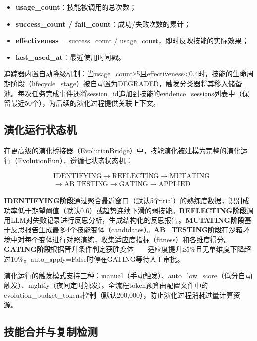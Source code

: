 \documentclass[conference]{IEEEtran}
\begin{document}
\begin{itemize}[nosep]
\item \textbf{usage\_count}：技能被调用的总次数；
\item \textbf{success\_count / fail\_count}：成功/失败次数的累计；
\item \textbf{effectiveness} = success\_count / usage\_count，即时反映技能的实际效果；
\item \textbf{last\_used\_at}：最近使用时间戳。
\end{itemize}

追踪器内置自动降级机制：当usage\_count≥5且effectiveness<0.4时，技能的生命周期阶段（lifecycle\_stage）被自动置为DEGRADED，触发分类器将其移入储备池。每次任务完成事件还将session\_id追加到技能的evidence\_sessions列表中（保留最近50个），为后续的演化过程提供关联上下文。

\subsection{演化运行状态机}

在更高级的演化桥接器（EvolutionBridge）中，技能演化被建模为完整的演化运行（EvolutionRun），遵循七状态状态机：

\begin{equation}
\begin{aligned}
&\mathrm{IDENTIFYING} \rightarrow \mathrm{REFLECTING} \rightarrow \mathrm{MUTATING} \\
&\rightarrow \mathrm{AB\_TESTING} \rightarrow \mathrm{GATING} \rightarrow \mathrm{APPLIED}
\end{aligned}
\label{eq:evo_state}
\end{equation}

\textbf{IDENTIFYING阶段}通过聚合最近窗口（默认5个trial）的熟练度数据，识别成功率低于期望阈值（默认0.6）或趋势连续下滑的弱技能。\textbf{REFLECTING阶段}调用LLM对失败记录进行反思分析，生成结构化的反思报告。\textbf{MUTATING阶段}基于反思报告生成最多4个技能变体（candidates）。\textbf{AB\_TESTING阶段}在沙箱环境中对每个变体进行对照演练，收集适应度指标（fitness）和各维度得分。\textbf{GATING阶段}根据晋升条件判定获胜变体——适应度提升≥5\%且无单维度下降超过10\%。auto\_apply=False时停在GATING等待人工审批。

演化运行的触发模式支持三种：manual（手动触发）、auto\_low\_score（低分自动触发）、nightly（夜间定时触发）。全流程token预算由配置文件中的evolution\_budget\_tokens控制（默认200,000），防止演化过程消耗过量计算资源。

\subsection{技能合并与复制检测}
\end{document}
